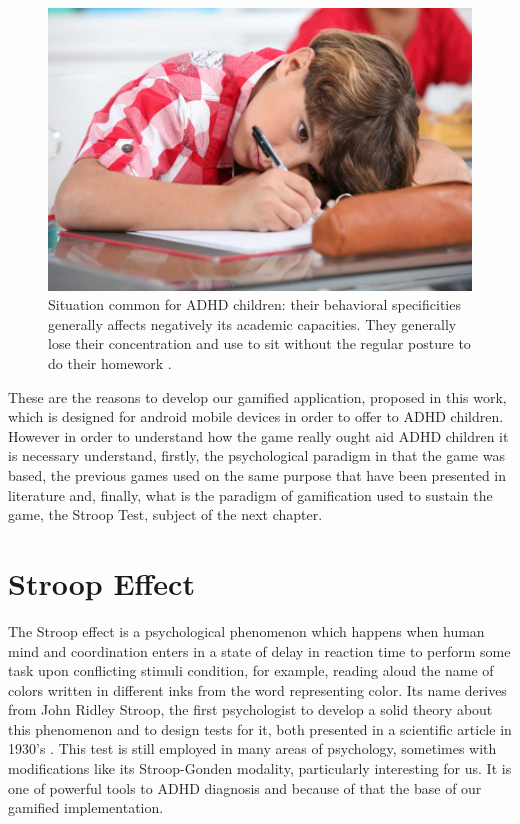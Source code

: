 \begin{figure}[htp]
	\begin{center}
		\includegraphics[scale=0.35]{chapters/adhd/img/adhd_child.jpeg}
		\caption{Situation common for ADHD children: their behavioral specificities generally affects negatively its academic capacities. They generally lose their concentration and use to sit without the regular posture to do their homework \citep{child_example}.}
		\label{child}
	\end{center}
\end{figure}

These are the reasons to develop our gamified application, proposed in this work, which is designed for android mobile devices in order to offer to ADHD children. However in order to understand how the game really ought aid ADHD children it is necessary understand, firstly, the psychological paradigm in that the game was based, the previous games used on the same purpose that have been presented in literature and, finally, what is the paradigm of gamification used to sustain the game, the Stroop Test, subject of the next chapter. 


\section{Stroop Effect}

The Stroop effect is a psychological phenomenon which happens when human mind and coordination enters in a state of delay in reaction time to perform some task upon conflicting stimuli  condition, for example, reading aloud the name of colors written in different inks from the word representing color. Its name derives from John Ridley Stroop, the first psychologist to develop a solid theory about this phenomenon and to design tests for it, both presented in a scientific article in 1930's \citep{Studies1935}. This test is still employed in many areas of psychology, sometimes with modifications like its Stroop-Gonden modality, particularly interesting for us. It is one of powerful tools to ADHD diagnosis and because of that the base of our gamified implementation.

